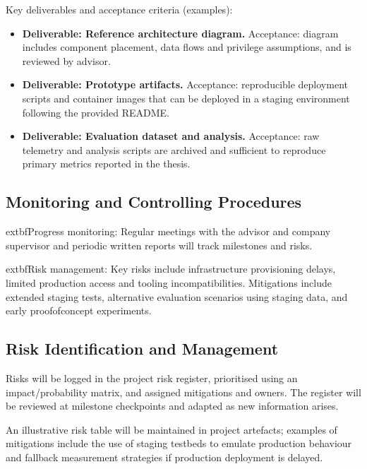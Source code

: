 Key deliverables and acceptance criteria (examples):
\begin{itemize}
    \item \textbf{Deliverable: Reference architecture diagram.} Acceptance: diagram includes component placement, data flows and privilege assumptions, and is reviewed by advisor.
    \item \textbf{Deliverable: Prototype artifacts.} Acceptance: reproducible deployment scripts and container images that can be deployed in a staging environment following the provided README.
    \item \textbf{Deliverable: Evaluation dataset and analysis.} Acceptance: raw telemetry and analysis scripts are archived and sufficient to reproduce primary metrics reported in the thesis.
\end{itemize}

\subsection{Monitoring and Controlling Procedures}
	extbf{Progress monitoring:} Regular meetings with the advisor and company supervisor and periodic written reports will track milestones and risks.

	extbf{Risk management:} Key risks include infrastructure provisioning delays, limited production access and tooling incompatibilities. Mitigations include extended staging tests, alternative evaluation scenarios using staging data, and early proof\-of\-concept experiments.

\subsection{Risk Identification and Management}
Risks will be logged in the project risk register, prioritised using an impact/probability matrix, and assigned mitigations and owners. The register will be reviewed at milestone checkpoints and adapted as new information arises.

An illustrative risk table will be maintained in project artefacts; examples of mitigations include the use of staging testbeds to emulate production behaviour and fallback measurement strategies if production deployment is delayed.
